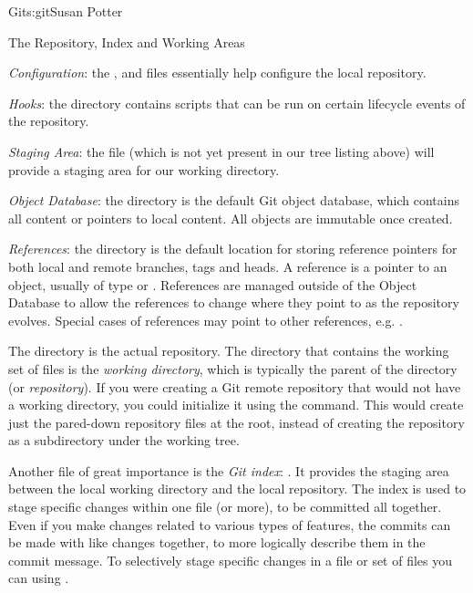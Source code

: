 \begin{aosachapter}{Git}{s:git}{Susan Potter}
\begin{aosasect1}{The Repository, Index and Working Areas}
\begin{aosaitemize}
  \item \emph{Configuration}: the ,  and
   files essentially help configure the local repository.
  \item \emph{Hooks}: the  directory contains scripts that can
  be run on certain lifecycle events of the repository.
  \item \emph{Staging Area}: the  file (which is not yet
  present in our tree listing above) will provide a staging area for our
  working directory.
  \item \emph{Object Database}: the  directory is the default
  Git object database, which contains all content or pointers to local
  content. All objects are immutable once created.
  \item \emph{References}: the  directory is the default location
  for storing reference pointers for both local and remote branches, tags and
  heads. A reference is a pointer to an object, usually of type  or
  . References are managed outside of the Object Database to
  allow the references to change where they point to as the repository
  evolves. Special cases of references may point to other references, e.g.
  .
\end{aosaitemize}

The  directory is the actual repository. The directory that contains the
working set of files is the \emph{working directory}, which is typically the
parent of the  directory (or \emph{repository}). If you were creating a
Git remote repository that would not have a working directory, you could
initialize it using the  command. This would create
just the pared-down repository files at the root, instead of creating the repository
as a subdirectory under the working tree.

Another file of great importance is the \emph{Git index}: . It provides the
staging area between the local working directory and the local repository.
The index is used to stage specific changes within one file (or more), to
be committed all together. Even if you make changes related to various types
of features, the commits can be made with like changes together, to more
logically describe them in the commit message. To selectively stage
specific changes in a file or set of files you can using .


\end{aosasect1}
\end{aosachapter}
